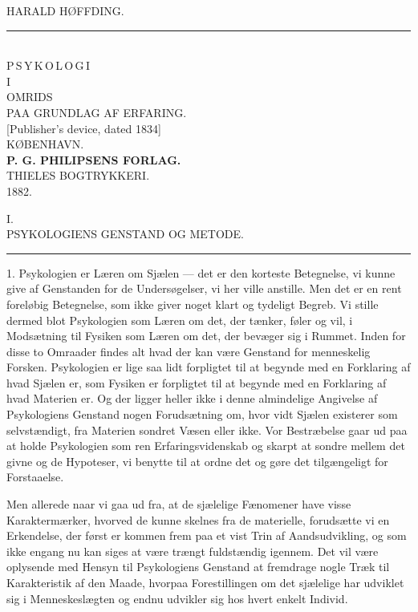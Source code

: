 \documentclass[12pt,a4paper,openany]{book}
\newcommand{\opage}[1]{\marginnote{\footnotesize\textit{[#1]}}}
\begin{document}
\begin{titlepage}
\begin{center}
HARALD HØFFDING.\\[4pt]
\rule{1.5cm}{0.4pt}\\[36pt]
{\Huge P\,S\,Y\,K\,O\,L\,O\,G\,I}\\[14pt]
{\footnotesize I}\\[14pt]
{\LARGE OMRIDS}\\[14pt]
PAA GRUNDLAG AF ERFARING.\\[40pt]
{\small [Publisher's device, dated 1834]}\\[40pt]
KØBENHAVN.\\[4pt]
\textbf{P. G. PHILIPSENS FORLAG.}\\[4pt]
{\scriptsize THIELES BOGTRYKKERI.}\\[4pt]
{\small 1882.}
\end{center}
\end{titlepage}

\opage{1}\begin{center}I.\\[4pt] PSYKOLOGIENS GENSTAND OG METODE.\\[2pt]\rule{1.5cm}{0.4pt}\end{center}

1. Psykologien er Læren om Sjælen --- det er den korteste Betegnelse, vi
kunne give af Genstanden for de Undersøgelser, vi her ville anstille.
Men det er en rent foreløbig Betegnelse, som ikke giver noget klart og
tydeligt Begreb. Vi stille dermed blot Psykologien som Læren om det, der
tænker, føler og vil, i Modsætning til Fysiken som Læren om det, der
bevæger sig i Rummet. Inden for disse to Omraader findes alt hvad der
kan være Genstand for menneskelig Forsken. Psykologien er lige saa lidt
forpligtet til at begynde med en Forklaring af hvad Sjælen er, som
Fysiken er forpligtet til at begynde med en Forklaring af hvad Materien
er. Og der ligger heller ikke i denne almindelige Angivelse af
Psykologiens Genstand nogen Forudsætning om, hvor vidt Sjælen existerer
som selvstændigt, fra Materien sondret Væsen eller ikke. Vor Bestræbelse
gaar ud paa at holde Psykologien som ren Erfaringsvidenskab og skarpt at
sondre mellem det givne og de Hypoteser, vi benytte til at ordne det og
gøre det tilgængeligt for Forstaaelse.

Men allerede naar vi gaa ud fra, at de sjælelige Fænomener have visse
Karaktermærker, hvorved de kunne skelnes fra de materielle, forudsætte
vi en Erkendelse, der først er kommen frem paa et vist Trin af
Aandsudvikling, og som ikke engang nu kan siges at være trængt
fuldstændig igennem. Det vil være oplysende med Hensyn til Psykologiens
Genstand at fremdrage nogle Træk til Karakteristik af den Maade, hvorpaa
Forestillingen om det sjælelige har udviklet sig i Menneskeslægten og
endnu udvikler sig hos hvert enkelt Individ.
\end{document}
